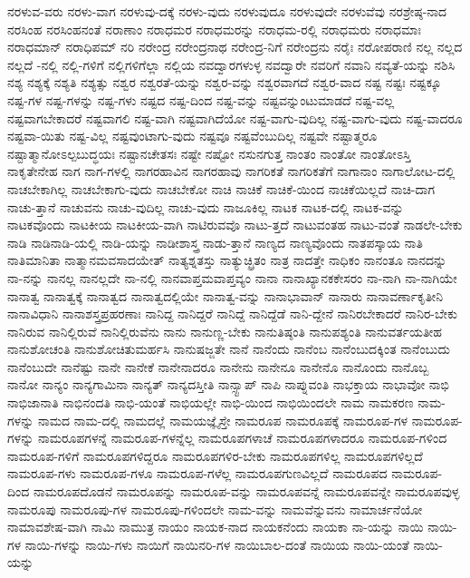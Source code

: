 {ನರಳುವ-ವರು
ನರಳು-ವಾಗ
ನರಳುವು-ದಕ್ಕೆ
ನರಳು-ವುದು
ನರಳುವುದೂ
ನರಳುವುದೇ
ನರಳುವೆವು
ನರಶ್ರೇಷ್ಠ-ನಾದ
ನರಸಿಂಹ
ನರಸಿಂಹನಂತೆ
ನರಾಣಾಂ
ನರಾಧಮರ
ನರಾಧಮರನ್ನು
ನರಾಧಮ-ರಲ್ಲಿ
ನರಾಧಮರು
ನರಾಧಮಾಃ
ನರಾಧಮಾನ್
ನರಾಧಿಪಮ್
ನರಿ
ನರೇಂದ್ರ
ನರೇಂದ್ರನಾಥ
ನರೇಂದ್ರ-ನಿಗೆ
ನರೇಂದ್ರನು
ನರೈಃ
ನರೋಪರಾಣಿ
ನಲ್ಲ
ನಲ್ಲದ
ನಲ್ಲದೆ
-ನಲ್ಲಿ
ನಲ್ಲಿ-ಗಳಿಗೆ
ನಲ್ಲಿಗಳಿಗೆಲ್ಲಾ
ನಲ್ಲಿಯ
ನವದ್ವಾರಗಳುಳ್ಳ
ನವದ್ವಾರೇ
ನವರಿಗೆ
ನವಾನಿ
ನವ್ಯತೆ-ಯನ್ನು
ನಶಿಸಿ
ನಶ್ಯ
ನಶ್ಯಕ್ಕೆ
ನಶ್ಯತಿ
ನಶ್ಯತ್ಸು
ನಶ್ವರ
ನಶ್ವರತೆ-ಯನ್ನು
ನಶ್ವರ-ವನ್ನು
ನಶ್ವರವಾಗದೆ
ನಶ್ವರ-ವಾದ
ನಷ್ಟ
ನಷ್ಟಃ
ನಷ್ಟಕ್ಕೂ
ನಷ್ಟ-ಗಳ
ನಷ್ಟ-ಗಳನ್ನು
ನಷ್ಟ-ಗಳು
ನಷ್ಟದ
ನಷ್ಟ-ದಿಂದ
ನಷ್ಟ-ವನ್ನು
ನಷ್ಟವನ್ನುಂಟುಮಾಡದೆ
ನಷ್ಟ-ವಲ್ಲ
ನಷ್ಟವಾಗಬೇಕಾದರೆ
ನಷ್ಟವಾಗಲಿ
ನಷ್ಟ-ವಾಗಿ
ನಷ್ಟವಾಗಿದೆಯೋ
ನಷ್ಟ-ವಾಗು-ವುದಿಲ್ಲ
ನಷ್ಟ-ವಾಗು-ವುದು
ನಷ್ಟ-ವಾದರೂ
ನಷ್ಟವಾ-ಯಿತು
ನಷ್ಟ-ವಿಲ್ಲ
ನಷ್ಟವುಂಟಾಗು-ವುದು
ನಷ್ಟವೂ
ನಷ್ಟವೆಂಬುದಿಲ್ಲ
ನಷ್ಟವೇ
ನಷ್ಟಾತ್ಮರೂ
ನಷ್ಟಾತ್ಮಾನೋಽಲ್ಪಬುದ್ಧಯಃ
ನಷ್ಟಾನಚೇತಸಃ
ನಷ್ಟೇ
ನಷ್ಟೋ
ನಸುನಗುತ್ತ
ನಾಂತಂ
ನಾಂತೋ
ನಾಂತೋಽಸ್ತಿ
ನಾಕೃತೇನೇಹ
ನಾಗ
ನಾಗ-ಗಳಲ್ಲಿ
ನಾಗರಹಾವಿನ
ನಾಗರಹಾವು
ನಾಗರಿಕತೆ
ನಾಗರಿಕತೆಗೆ
ನಾಗಾನಾಂ
ನಾಗಾಲೋಟ-ದಲ್ಲಿ
ನಾಚಬೇಕಾಗಿಲ್ಲ
ನಾಚಬೇಕಾಗು-ವುದು
ನಾಚಬೇಕೋ
ನಾಚಿ
ನಾಚಿಕೆ
ನಾಚಿಕೆ-ಯಿಂದ
ನಾಚಿಕೆಯಿಲ್ಲದೆ
ನಾಚಿ-ದಾಗ
ನಾಚು-ತ್ತಾನೆ
ನಾಚುವನು
ನಾಚು-ವುದಿಲ್ಲ
ನಾಚು-ವುದು
ನಾಜೂಕಿಲ್ಲ
ನಾಟಕ
ನಾಟಕ-ದಲ್ಲಿ
ನಾಟಕ-ವನ್ನು
ನಾಟಕವೊಂದು
ನಾಟಕೀಯ
ನಾಟಕೀಯ-ವಾಗಿ
ನಾಟಿರುವವೊ
ನಾಟು-ತ್ತದೆ
ನಾಟುವಂತಹ
ನಾಟು-ವಂತೆ
ನಾಡಲೇ-ಬೇಕು
ನಾಡಿ
ನಾಡಿನಾಡಿ-ಯಲ್ಲಿ
ನಾಡಿ-ಯನ್ನು
ನಾಡೀಶಾಸ್ತ್ರ
ನಾಡು-ತ್ತಾನೆ
ನಾಣ್ಯದ
ನಾಣ್ಯವೊಂದು
ನಾತಪಸ್ಕಾಯ
ನಾತಿ
ನಾತಿಮಾನಿತಾ
ನಾತ್ಮಾನಮವಸಾದಯೇತ್
ನಾತ್ಯಶ್ನತಸ್ತು
ನಾತ್ಯುಚ್ಛ್ರಿತಂ
ನಾತ್ರ
ನಾದತ್ತೇ
ನಾಧಿಕಂ
ನಾನಂತೂ
ನಾನದನ್ನು
ನಾ-ನನ್ನು
ನಾನಲ್ಲ
ನಾನಲ್ಲದೇ
ನಾ-ನಲ್ಲಿ
ನಾನವಾಪ್ತಮವಾಪ್ತವ್ಯಂ
ನಾನಾ
ನಾನಾಖ್ಯಾನಕಕೇಸರಂ
ನಾ-ನಾಗಿ
ನಾ-ನಾಗಿಯೇ
ನಾನಾತ್ವ
ನಾನಾತ್ವಕ್ಕೆ
ನಾನಾತ್ವದ
ನಾನಾತ್ವದಲ್ಲಿಯೇ
ನಾನಾತ್ವ-ವನ್ನು
ನಾನಾಭಾವಾನ್
ನಾನಾರು
ನಾನಾವರ್ಣಾಕೃತೀನಿ
ನಾನಾವಿಧಾನಿ
ನಾನಾಶಸ್ತ್ರಪ್ರಹರಣಾಃ
ನಾನಿದ್ದ
ನಾನಿದ್ದರೆ
ನಾನಿದ್ದೆ
ನಾನಿದ್ದೆಡೆ
ನಾನಿ-ದ್ದೇನೆ
ನಾನಿರಬೇಕಾದರೆ
ನಾನಿರ-ಬೇಕು
ನಾನಿರುವ
ನಾನಿಲ್ಲಿರುವೆ
ನಾನಿಲ್ಲಿರುವೆನು
ನಾನು
ನಾನುಣ್ಣ-ಬೇಕು
ನಾನುತಿಷ್ಠಂತಿ
ನಾನುಪಶ್ಯಂತಿ
ನಾನುವರ್ತಯತೀಹ
ನಾನುಶೋಚಂತಿ
ನಾನುಶೋಚಿತುಮರ್ಹಸಿ
ನಾನುಷಜ್ಜತೇ
ನಾನೆ
ನಾನೆಂದು
ನಾನೆಂಬ
ನಾನೆಂಬುದಕ್ಕಿಂತ
ನಾನೆಂಬುದು
ನಾನೆಂಬುದೇ
ನಾನೆಷ್ಟು
ನಾನೇ
ನಾನೇಕೆ
ನಾನೇನಾದರೂ
ನಾನೇನು
ನಾನೇನೂ
ನಾನೇನೊ
ನಾನೊಂದು
ನಾನೊಬ್ಬ
ನಾನೋ
ನಾನ್ಯಂ
ನಾನ್ಯಗಾಮಿನಾ
ನಾನ್ಯತ್
ನಾನ್ಯದಸ್ತೀತಿ
ನಾನ್ಸ್ಟಾಪ್
ನಾಪಿ
ನಾಪ್ನುವಂತಿ
ನಾಭಕ್ತಾಯ
ನಾಭಾವೋ
ನಾಭಿ
ನಾಭಿಜಾನಾತಿ
ನಾಭಿನಂದತಿ
ನಾಭಿ-ಯಂತೆ
ನಾಭಿಯಲ್ಲೇ
ನಾಭಿ-ಯಿಂದ
ನಾಭಿಯಿಂದಲೇ
ನಾಮ
ನಾಮಕರಣ
ನಾಮ-ಗಳನ್ನು
ನಾಮದ
ನಾಮ-ದಲ್ಲಿ
ನಾಮದಲ್ಲೆ
ನಾಮಯಜ್ಞೈಸ್ತೇ
ನಾಮರೂಪ
ನಾಮರೂಪಕ್ಕೆ
ನಾಮರೂಪ-ಗಳ
ನಾಮರೂಪ-ಗಳನ್ನು
ನಾಮರೂಪಗಳನ್ನೆ
ನಾಮರೂಪ-ಗಳನ್ನೆಲ್ಲ
ನಾಮರೂಪಗಳಾಚೆ
ನಾಮರೂಪಗಳಾದರೂ
ನಾಮರೂಪ-ಗಳಿಂದ
ನಾಮರೂಪ-ಗಳಿಗೆ
ನಾಮರೂಪಗಳಿದ್ದರೂ
ನಾಮರೂಪಗಳಿರ-ಬೇಕು
ನಾಮರೂಪಗಳಿಲ್ಲ
ನಾಮರೂಪಗಳಿಲ್ಲದೆ
ನಾಮರೂಪ-ಗಳು
ನಾಮರೂಪ-ಗಳೂ
ನಾಮರೂಪ-ಗಳೆಲ್ಲ
ನಾಮರೂಪಗುಣವಿಲ್ಲದೆ
ನಾಮರೂಪದ
ನಾಮರೂಪ-ದಿಂದ
ನಾಮರೂಪದೊಡನೆ
ನಾಮರೂಪನ್ನು
ನಾಮರೂಪ-ವನ್ನು
ನಾಮರೂಪವನ್ನೆ
ನಾಮರೂಪವನ್ನೇ
ನಾಮರೂಪವುಳ್ಳ
ನಾಮರೂಪು
ನಾಮರೂಪು-ಗಳ
ನಾಮರೂಪು-ಗಳಿಂದಲೇ
ನಾಮ-ವನ್ನು
ನಾಮವೆನ್ನುವನು
ನಾಮಾರ್ಚನೆಯೋ
ನಾಮಾವಶೇಷ-ವಾಗಿ
ನಾಮಿ
ನಾಮುತ್ರ
ನಾಯಂ
ನಾಯಕ-ನಾದ
ನಾಯಕನೆಂದು
ನಾಯಕಾ
ನಾ-ಯನ್ನು
ನಾಯಿ
ನಾಯಿ-ಗಳ
ನಾಯಿ-ಗಳನ್ನು
ನಾಯಿ-ಗಳು
ನಾಯಿಗೆ
ನಾಯಿನರಿ-ಗಳ
ನಾಯಿಬಾಲ-ದಂತೆ
ನಾಯಿಯ
ನಾಯಿ-ಯಂತೆ
ನಾಯಿ-ಯನ್ನು
}
